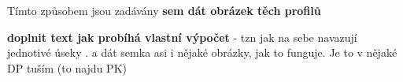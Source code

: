 
Tímto způsobem jsou zadávány
\textbf{sem dát obrázek těch profilů}


\textbf{doplnit text jak probíhá vlastní výpočet} - tzn jak na sebe navazují jednotivé úseky . a dát semka asi i nějaké  obrázky, jak to funguje. Je to v nějaké DP tuším (to najdu PK)


